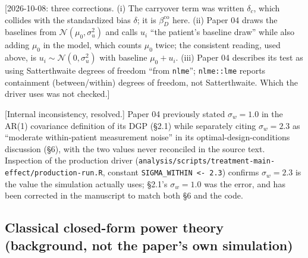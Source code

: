 \documentclass[11pt]{article}
\newcommand{\note}[1]{\textcolor{blue!60!black}{\small [#1]}}
\newcommand{\code}[1]{\texttt{#1}}
\begin{document}
\note{2026-10-08: three corrections. (i) The carryover term was written
$\delta_c$, which collides with the standardized bias $\delta$; it is
$\beta_D^{\mathrm{co}}$ here. (ii) Paper 04 draws the baselines from
$\mathcal N(\mu_0, \sigma_u^2)$ and calls $u_i$ ``the patient's baseline
draw'' while also adding $\mu_0$ in the model, which counts $\mu_0$
twice; the consistent reading, used above, is $u_i \sim \mathcal N(0,
\sigma_u^2)$ with baseline $\mu_0 + u_i$. (iii) Paper 04 describes
its test as using Satterthwaite degrees of freedom ``from
\code{nlme}''; \code{nlme::lme} reports containment (between/within)
degrees of freedom, not Satterthwaite. Which the driver uses was not
checked.}

\note{Internal inconsistency, resolved.} Paper 04 previously stated
$\sigma_w = 1.0$ in the AR(1) covariance definition of its DGP
(\S2.1) while separately citing $\sigma_w = 2.3$ as ``moderate
within-patient measurement noise'' in its optimal-design-conditions
discussion (\S6), with the two values never reconciled in the source
text. Inspection of the production driver
(\code{analysis/scripts/treatment-main-effect/production-run.R},
constant \code{SIGMA\_WITHIN <- 2.3}) confirms $\sigma_w = 2.3$ is
the value the simulation actually uses; \S2.1's $\sigma_w = 1.0$ was
the error, and has been corrected in the manuscript to match both
\S6 and the code.

\subsection{Classical closed-form power theory (background, not the
paper's own simulation)}
\end{document}
